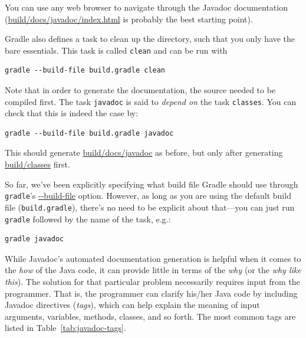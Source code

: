 \documentclass[12pt, a4paper, twoside,openany,titlepage]{article}
\begin{document}
You can use any web browser to navigate through the Javadoc documentation (\url{build/docs/javadoc/index.html} is probably the best starting point).

Gradle also defines a task to clean up the directory, such that you only have the bare essentials. This task is called \texttt{clean} and can be run with
\begin{lstlisting}[style=basic,style=bash]
gradle --build-file build.gradle clean
\end{lstlisting}


Note that in order to generate the documentation, the source needed to be compiled first. The task \texttt{javadoc} is said to \textit{depend on} the task \texttt{classes}. You can check that this is indeed the case by:
\begin{lstlisting}[style=basic,style=bash]
gradle --build-file build.gradle javadoc
\end{lstlisting}
This should generate \url{build/docs/javadoc} as before, but only after generating \url{build/classes} first.


So far, we've been explicitly specifying what build file Gradle should use through \texttt{gradle}'s \url{--build-file} option. However, as long as you are using the default build file (\texttt{build.gradle}), there's no need to be explicit about that---you can just run \texttt{gradle} followed by the name of the task, e.g.:
\begin{lstlisting}[style=basic,style=bash]
gradle javadoc
\end{lstlisting}

While Javadoc's automated documentation generation is helpful when it comes to the \textit{how} of the Java code, it can provide little in terms of the \textit{why} (or the \textit{why like this}). The solution for that particular problem necessarily requires input from the programmer. That is, the programmer can clarify his/her Java code by including Javadoc directives (\textit{tags}), which can help explain the meaning of input arguments, variables, methods, classes, and so forth. The most common tags are listed in Table~\ref{tab:javadoc-tags}.
\end{document}
